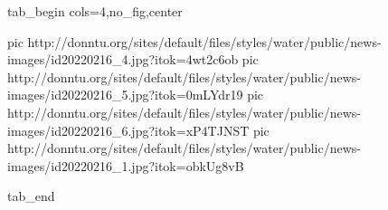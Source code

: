  
 
 
 
 


\ifcmt
  tab_begin cols=4,no_fig,center

     pic http://donntu.org/sites/default/files/styles/water/public/news-images/id20220216_4.jpg?itok=4wt2c6ob
		 pic http://donntu.org/sites/default/files/styles/water/public/news-images/id20220216_5.jpg?itok=0mLYdr19
		 pic http://donntu.org/sites/default/files/styles/water/public/news-images/id20220216_6.jpg?itok=xP4TJNST
		 pic http://donntu.org/sites/default/files/styles/water/public/news-images/id20220216_1.jpg?itok=obkUg8vB

  tab_end
\fi
